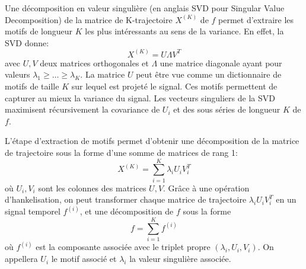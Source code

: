 \documentclass{gretsi}
\def\HH{\mathcal H}
\newcommand{\R}{\mathbb R}
\begin{document}


Une décomposition en valeur singulière (en anglais SVD pour Singular Value Decomposition) de la matrice de K-trajectoire $X^{(K)}$ de $f$ permet d'extraire les motifs de longueur $K$ les plus intéressants au sens de la variance.
En effet, la SVD donne: 
\begin{equation*}
    X^{(K)} = U \Lambda V^T
\end{equation*}
avec $U, V$ deux matrices orthogonales et $\Lambda$ une matrice diagonale ayant pour valeurs $\lambda_1\ge \dots\ge \lambda_K$.
La matrice $U$ peut être vue comme un dictionnaire de motifs de taille $K$ sur lequel est projeté le signal.
Ces motifs permettent de capturer au mieux la variance du signal.
Les vecteurs singuliers de la SVD maximisent récursivement la covariance de $U_i$ et des sous séries de longueur $K$ de $f$.



L'étape d'extraction de motifs permet d'obtenir une décomposition de la matrice de trajectoire sous la forme d'une somme de matrices de rang 1:
\begin{equation*}
    X^{(K)} = \sum_{i=1}^K \lambda_i U_iV_i^T 
\end{equation*}
où  $U_i, V_i$ sont les colonnes des matrices $U, V$.
Grâce à une opération d'hankelisation, on peut transformer chaque matrice de trajectoire $\lambda_iU_iV_i^T$  en un signal temporel $f^{(i)}$, et une décomposition de $f$ sous la forme 
\begin{equation*}
    f = \sum_{i=1}^K f^{(i)}
\end{equation*}
où $f^{(i)} $ est la composante associée avec le triplet propre $(\lambda_i, U_i, V_i)$.
On appellera $U_i$ le motif associé et $\lambda_i$ la valeur singulière associée.
\end{document}
